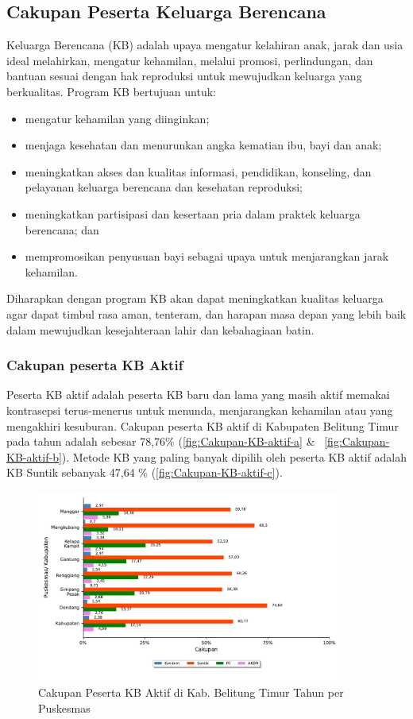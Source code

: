 \subsection{Cakupan Peserta Keluarga Berencana}
Keluarga Berencana (KB) adalah upaya mengatur kelahiran anak, jarak dan usia ideal melahirkan, mengatur kehamilan, melalui promosi, perlindungan, dan bantuan sesuai dengan hak reproduksi untuk mewujudkan keluarga yang berkualitas. Program KB bertujuan untuk:
\begin{itemize}
 \item mengatur kehamilan yang diinginkan;
 \item menjaga kesehatan dan menurunkan angka kematian ibu, bayi dan anak;
 \item meningkatkan akses dan kualitas informasi, pendidikan, konseling, dan pelayanan keluarga berencana dan kesehatan reproduksi;
 \item meningkatkan partisipasi dan kesertaan pria dalam praktek keluarga berencana; dan
 \item mempromosikan penyusuan bayi sebagai upaya untuk menjarangkan jarak kehamilan.
\end{itemize}
Diharapkan dengan program KB akan dapat meningkatkan kualitas keluarga agar dapat timbul rasa aman, tenteram, dan harapan masa depan yang lebih baik dalam mewujudkan kesejahteraan lahir dan kebahagiaan batin.

\subsubsection{Cakupan peserta KB Aktif}
Peserta KB aktif adalah peserta KB baru dan lama yang masih aktif memakai kontrasepsi terus-menerus untuk menunda, menjarangkan kehamilan atau yang mengakhiri kesuburan. Cakupan peserta KB aktif di Kabupaten Belitung Timur pada tahun \tP adalah sebesar 78,76\% (\autoref{fig:Cakupan-KB-aktif-a} \& ~\autoref{fig:Cakupan-KB-aktif-b}). Metode KB yang paling banyak dipilih oleh peserta KB aktif adalah KB Suntik sebanyak 47,64 \% (\autoref{fig:Cakupan-KB-aktif-c}).

\begin{figure}[H]
    \centering
    \includegraphics[width=0.9\textwidth]{bab_05/bab_05_06_KBaktif_a}
    \caption{Cakupan Peserta KB Aktif di Kab. Belitung Timur Tahun \tP per Puskesmas}
    \label{fig:Cakupan-KB-aktif-a}
\end{figure}

